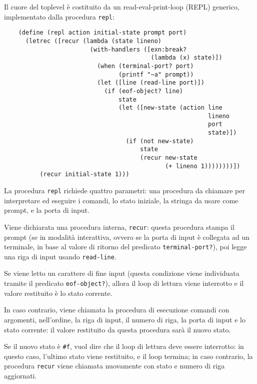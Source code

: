 Il cuore del toplevel \`e costituito da un read-eval-print-loop (REPL)
generico, implementato dalla procedura \lstinline{repl}:

\begin{lstlisting}
    (define (repl action initial-state prompt port)
      (letrec ([recur (lambda (state lineno)
                        (with-handlers ([exn:break?
                                         (lambda (x) state)])
                          (when (terminal-port? port)
                                (printf "~a" prompt))
                          (let ([line (read-line port)])
                            (if (eof-object? line)
                                state
                                (let ([new-state (action line
                                                         lineno
                                                         port
                                                         state)])
                                  (if (not new-state)
                                      state
                                      (recur new-state
                                             (+ lineno 1))))))))])
          (recur initial-state 1)))
\end{lstlisting}

La procedura \lstinline{repl} richiede quattro parametri: una procedura
da chiamare per interpretare ed eseguire i comandi, lo stato iniziale,
la stringa da usare come prompt, e la porta di input.

Viene dichiarata una procedura interna, \lstinline{recur}: questa
procedura stampa il prompt (se in modalit\`a interattiva, ovvero se la
porta di input \`e collegata ad un terminale, in base al valore di
ritorno del predicato \lstinline{terminal-port?}), poi legge una riga
di input usando \lstinline{read-line}.

Se viene letto un carattere di fine input (questa condizione viene
individuata tramite il predicato \lstinline{eof-object?}), allora il
loop di lettura viene interrotto e il valore restituito \`e lo stato
corrente.

In caso contrario, viene chiamata la procedura di esecuzione comandi
con argomenti, nell'ordine, la riga di input, il numero di riga, la
porta di input e lo stato corrente: il valore restituito da questa
procedura sar\`a il nuovo stato.

Se il nuovo stato \`e \lstinline{#f}, vuol dire che il loop di lettura
deve essere interrotto: in questo caso, l'ultimo stato viene restituito,
e il loop termina; in caso contrario, la procedura \lstinline{recur}
viene chiamata nuovamente con stato e numero di riga aggiornati.

